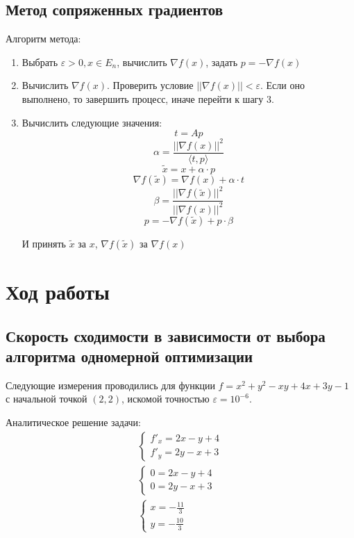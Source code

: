	\subsection{Метод сопряженных градиентов}
	
	Алгоритм метода:
	\begin{enumerate}
		\item Выбрать \(\varepsilon > 0, x \in E_n\), вычислить \(\nabla f(x)\), задать \(p = -\nabla f(x)\)
		\item Вычислить \(\nabla f(x)\). Проверить условие \(||\nabla f(x)|| < \varepsilon\). Если оно выполнено, то завершить процесс, иначе перейти к шагу 3.
		\item Вычислить следующие значения:
		\[t = Ap\]
		\[\alpha = \frac{||\nabla f(x)||^2}{\langle t, p\rangle} \]
		\[\tilde{x} = x + \alpha \cdot p\]
		\[\nabla f(\tilde{x}) = \nabla f(x) + \alpha \cdot t\]
		\[\beta = \frac{||\nabla f(\tilde{x})||^2}{||\nabla f(x)||^2}\]
		\[p = - \nabla f(\tilde{x}) + p \cdot \beta\]
		
		И принять \(\tilde{x}\) за \(x\), \(\nabla f(\tilde{x})\) за \(\nabla f(x)\)
	\end{enumerate}
	
	\section{Ход работы}
	
	\subsection{Скорость сходимости в зависимости от выбора алгоритма одномерной оптимизации}
	
	Следующие измерения проводились для функции \(f = x^2 + y^2 - xy + 4x + 3y - 1\) с начальной точкой \((2, 2)\), искомой точностью \(\varepsilon = 10^{ - 6}\).
	
	Аналитическое решение задачи:
	\begin{align*}
	& \begin{cases}
	f'_x = 2x - y + 4 \\
	f'_y = 2y - x + 3
	\end{cases}  & \\
	& \begin{cases}
	0 = 2x - y + 4 \\
	0 = 2y - x + 3
	\end{cases}   \\
	& \begin{cases} x = - \frac{11}{3} \\ y = - \frac{10}{3} \end{cases}
	\end{align*}
	
